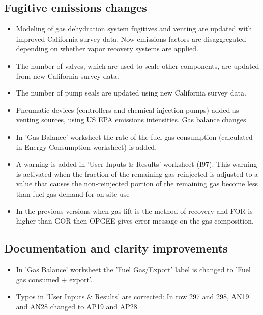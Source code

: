 \documentclass[11pt]{report}
\begin{document}
{{{{\subsection{Fugitive emissions changes}
\begin{itemize}
\item Modeling of gas dehydration system fugitives and venting are updated with improved California survey data. Now emissions factors are disaggregated depending on whether vapor recovery systems are applied.

\item The number of valves, which are used to scale other components, are updated from new California survey data.

\item The number of pump seals are updated using new California survey data.

\item Pneumatic devices (controllers and chemical injection pumps) added as venting sources, using US EPA emissions intensities.
Gas balance changes 

\item In 'Gas Balance' worksheet the rate of the fuel gas consumption (calculated in Energy Consumption worksheet) is added.

\item A warning is added in 'User Inputs \& Results' worksheet (I97). This warning is activated when the fraction of the remaining gas reinjected is adjusted to a value that causes the non-reinjected portion of the remaining gas become less than fuel gas demand for on-site use

\item In the previous versions when gas lift is the method of recovery and FOR is higher than GOR then OPGEE gives error message on the gas composition.
\end{itemize}
\subsection{Documentation and clarity improvements} 
\begin{itemize}
\item In 'Gas Balance' worksheet the 'Fuel Gas/Export' label is changed to 'Fuel gas consumed + export'.
\item Typos in 'User Inputs \& Results' are corrected: In row 297 and 298, AN19 and AN28 changed to AP19 and AP28
\end{itemize}




}}}}
\end{document}
